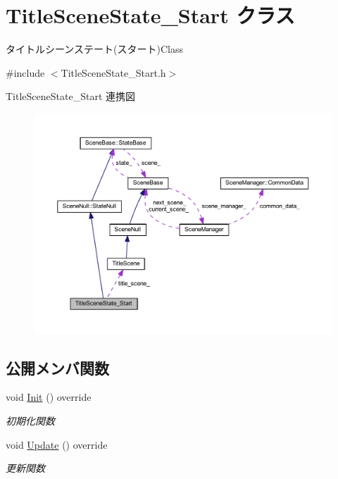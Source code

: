 \hypertarget{class_title_scene_state___start}{}\section{Title\+Scene\+State\+\_\+\+Start クラス}
\label{class_title_scene_state___start}


タイトルシーンステート(スタート)Class  




{\ttfamily \#include $<$Title\+Scene\+State\+\_\+\+Start.\+h$>$}



Title\+Scene\+State\+\_\+\+Start 連携図\nopagebreak
\begin{figure}[H]
\begin{center}
\leavevmode
\includegraphics[width=350pt]{class_title_scene_state___start__coll__graph}
\end{center}
\end{figure}
\subsection*{公開メンバ関数}
\begin{DoxyCompactItemize}
\item 
void \mbox{\hyperlink{class_title_scene_state___start_a3e785ba088ac3fd0989fd657e5d0cd34}{Init}} () override
\begin{DoxyCompactList}\small\item\em 初期化関数 \end{DoxyCompactList}\item 
void \mbox{\hyperlink{class_title_scene_state___start_a2e98cf6810711b58766d7147168d02eb}{Update}} () override
\begin{DoxyCompactList}\small\item\em 更新関数 \end{DoxyCompactList}\end{DoxyCompactItemize}
